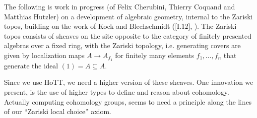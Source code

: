 
The following is work in progress (of Felix Cherubini, Thierry Coquand and Matthias  Hutzler) on a development of algebraic geometry, internal to the Zariski topos, building on the work of Kock and Blechschmidt (\cite{kock-sdg}[I.12], \cite{ingo-thesis}).
The Zariski topos consists of sheaves on the site opposite to the category of finitely presented algebras over a fixed ring, with the Zariski topology, i.e. generating covers are given by localization maps $A\to A_{f_1}$ for finitely many elements $f_1,\dots,f_n$ that generate the ideal $(1)=A\subseteq A$.

Since we use HoTT, we need a higher version of these sheaves.
One innovation we present, is the use of higher types to define and reason about cohomology.
Actually computing cohomology groups, seems to need a principle along the lines of our ``Zariski local choice'' axiom.